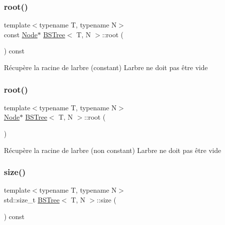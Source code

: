 \subsubsection{\texorpdfstring{root()}{root()}\hspace{0.1cm}{\footnotesize\ttfamily [1/2]}}
{\footnotesize\ttfamily template$<$typename T, typename N$>$ \\
const \hyperlink{classBSTree_a9c1a06548b3ff425e1d906f17ce2c858}{Node}$\ast$ \hyperlink{classBSTree}{B\+S\+Tree}$<$ T, N $>$\+::root (\begin{DoxyParamCaption}{ }\end{DoxyParamCaption}) const\hspace{0.3cm}{\ttfamily [inline]}}

Récupère la racine de l\textquotesingle{}arbre (constant) L\textquotesingle{}arbre ne doit pas être vide \mbox{\label{classBSTree_aed02cf07356874a6978850a8cf4802aa}} 
\subsubsection{\texorpdfstring{root()}{root()}\hspace{0.1cm}{\footnotesize\ttfamily [2/2]}}
{\footnotesize\ttfamily template$<$typename T, typename N$>$ \\
\hyperlink{classBSTree_a9c1a06548b3ff425e1d906f17ce2c858}{Node}$\ast$ \hyperlink{classBSTree}{B\+S\+Tree}$<$ T, N $>$\+::root (\begin{DoxyParamCaption}{ }\end{DoxyParamCaption})\hspace{0.3cm}{\ttfamily [inline]}}

Récupère la racine de l\textquotesingle{}arbre (non constant) L\textquotesingle{}arbre ne doit pas être vide \mbox{\label{classBSTree_a5a5453ddeb293754f7a5faf7a11ad066}} 
\subsubsection{\texorpdfstring{size()}{size()}}
{\footnotesize\ttfamily template$<$typename T, typename N$>$ \\
std\+::size\+\_\+t \hyperlink{classBSTree}{B\+S\+Tree}$<$ T, N $>$\+::size (\begin{DoxyParamCaption}{ }\end{DoxyParamCaption}) const\hspace{0.3cm}{\ttfamily [inline]}}

